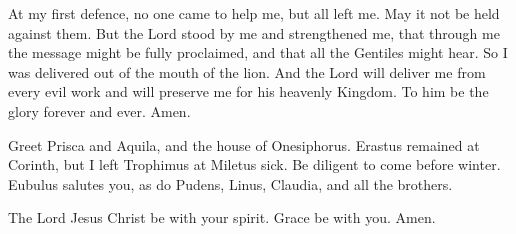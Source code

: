  At my first defence, no one came to help me, but all
left me. May it not be held against them.  But the Lord
stood by me and strengthened me, that through me the message might be
fully proclaimed, and that all the Gentiles might hear. So I was
delivered out of the mouth of the lion.  And the Lord
will deliver me from every evil work and will preserve me for his
heavenly Kingdom. To him be the glory forever and ever. Amen.

 Greet Prisca and Aquila, and the house of Onesiphorus.
 Erastus remained at Corinth, but I left Trophimus at
Miletus sick.  Be diligent to come before winter. Eubulus
salutes you, as do Pudens, Linus, Claudia, and all the brothers.

 The Lord Jesus Christ be with your spirit. Grace be with
you. Amen.

